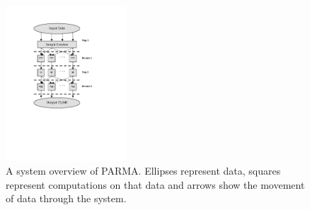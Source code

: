 \begin{figure}[htb]
\centering
\includegraphics[width=0.4\textwidth]{parma/overview.pdf}
\caption{A system overview of PARMA. Ellipses represent data, squares represent
computations on that data and arrows show the movement of data through the
system.}
\label{fig:parmaoverview}
\end{figure}



